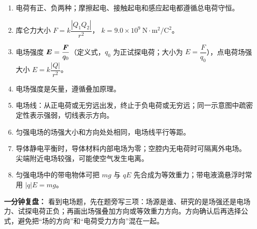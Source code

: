 \begin{enumerate}
  \item 电荷有正、负两种；摩擦起电、接触起电和感应起电都遵循总电荷守恒。
  \item 库仑力大小 $F = k\dfrac{|Q_1 Q_2|}{r^2}$，
  $k = 9.0\times10^9\ \mathrm{N\cdot m^2/C^2}$。
  \item 电场强度 $\boldsymbol{E} = \dfrac{\boldsymbol{F}}{q_0}$（定义式，$q_0$ 为正试探电荷；大小为 $E=\dfrac{F}{q_0}$），点电荷场强大小 $E = k\dfrac{|Q|}{r^2}$。
  \item 电场强度是矢量，遵循叠加原理。
  \item 电场线：从正电荷或无穷远出发，终止于负电荷或无穷远；同一示意图中疏密定性表示强弱，切线表示方向。
  \item 匀强电场的场强大小和方向处处相同，电场线平行等距。
  \item 导体静电平衡时，导体材料内部电场为零；空腔内无电荷时可隔离外电场。
  尖端附近电场较强，可能使空气发生电离。
  \item 匀强电场中的带电物体可把 $mg$ 与 $qE$ 先合成为等效重力；带电液滴悬浮时常用 $|q|E=mg$。
\end{enumerate}

\textbf{一分钟复盘：} 看到电场题，先在题旁写三项：场源是谁、研究的是场强还是电场力、试探电荷正负；再画出场强叠加方向或等效重力方向。方向确认后再选择公式，避免把“场的方向”和“电荷受力方向”混在一起。
